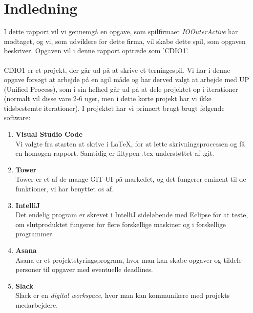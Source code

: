 \chapter{Indledning}
I dette rapport vil vi gennemgå en opgave, som spilfirmaet \textit{IOOuterActive} har modtaget, og vi, som udviklere for dette firma, vil skabe dette spil, som opgaven beskriver.
Opgaven vil i denne rapport optræde som 'CDIO1'.
\\\\CDIO1 er et projekt, der går ud på at skrive et terningespil.
Vi har i denne opgave forsøgt at arbejde på en agil måde og har derved valgt at arbejde med UP (Unified Process), som i sin helhed går ud på at dele projektet op i iterationer (normalt vil disse vare 2-6 uger, men i dette korte projekt har vi ikke tidsbestemte iterationer).
I projektet har vi primært brugt brugt følgende software:
\begin{enumerate}
    \item \textbf{Visual Studio Code}
    \\ Vi valgte fra starten at skrive i LaTeX, for at lette skrivningsprocessen og få en homogen rapport.
    Samtidig er filtypen .tex understøttet af .git.
    \item \textbf{Tower}
    \\Tower er et af de mange GIT-UI på markedet, og det fungerer eminent til de funktioner, vi har benyttet os af.
    \item \textbf{IntelliJ}
    \\Det endelig program er skrevet i IntelliJ sideløbende med Eclipse for at teste, om slutproduktet fungerer for flere forskellige maskiner og i forskellige programmer.
    \item \textbf{Asana}
    \\Asana er et projektstyringsprogram, hvor man kan skabe opgaver og tildele personer til opgaver med eventuelle deadlines.
    \item \textbf{Slack}
    \\Slack er en \textit{digital workspace}, hvor man kan kommunikere med projekts medarbejdere.
\end{enumerate}